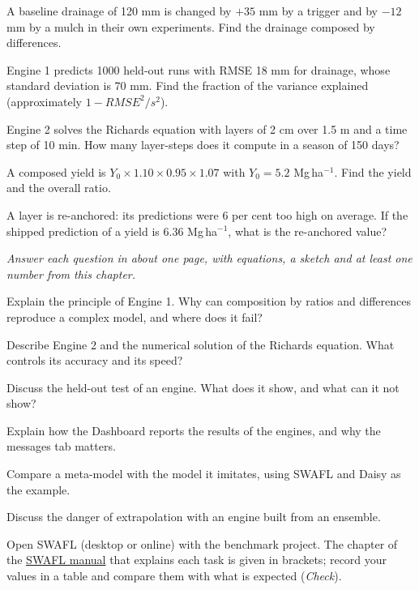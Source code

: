 \begin{exlist}
\item A baseline drainage of 120 mm is changed by $+35$ mm by a trigger and by $-12$ mm by a mulch in their own experiments. Find the drainage composed by differences.\exans{143 mm}
\item Engine 1 predicts 1000 held-out runs with RMSE 18 mm for drainage, whose standard deviation is 70 mm. Find the fraction of the variance explained (approximately $1-RMSE^2/s^2$).
\item Engine 2 solves the Richards equation with layers of 2 cm over 1.5 m and a time step of 10 min. How many layer-steps does it compute in a season of 150 days?
\item A composed yield is $Y_0\times1.10\times0.95\times1.07$ with $Y_0=5.2$ Mg\,ha$^{-1}$. Find the yield and the overall ratio.
\item A layer is re-anchored: its predictions were 6 per cent too high on average. If the shipped prediction of a yield is 6.36 Mg\,ha$^{-1}$, what is the re-anchored value?
\end{exlist}
{\small\itshape Answer each question in about one page, with equations, a sketch and at least one number from this chapter.}\par\vspace{3pt}
\begin{exlist}
\item Explain the principle of Engine 1. Why can composition by ratios and differences reproduce a complex model, and where does it fail?
\item Describe Engine 2 and the numerical solution of the Richards equation. What controls its accuracy and its speed?
\item Discuss the held-out test of an engine. What does it show, and what can it not show?
\item Explain how the Dashboard reports the results of the engines, and why the messages tab matters.
\item Compare a meta-model with the model it imitates, using SWAFL and Daisy as the example.
\item Discuss the danger of extrapolation with an engine built from an ensemble.
\end{exlist}
{\small Open SWAFL (desktop or online) with the benchmark project. The chapter of the \href{https://github.com/halilunaziru73-creator/Coupled-Water-Fluxes-Pore-Scale-Dynamics-Precision-Irrigation-Mulching-Feedback-Loops/raw/main/Software/v1.1.0/SWAFL_Desktop/docs/manual_v1.1.0/SWAFL_Manual_v1.1.0.pdf}{SWAFL manual} that explains each task is given in brackets; record your values in a table and compare them with what is expected (\emph{Check}).}\par\vspace{3pt}
